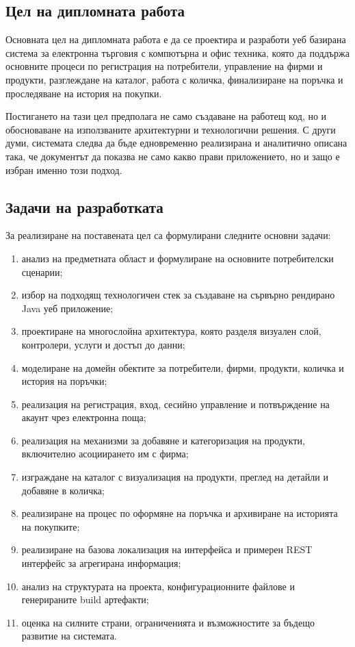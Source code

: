 \subsection{Цел на дипломната работа}

Основната цел на дипломната работа е да се проектира и разработи уеб базирана система за електронна търговия с компютърна и офис техника, която да поддържа основните процеси по регистрация на потребители, управление на фирми и продукти, разглеждане на каталог, работа с количка, финализиране на поръчка и проследяване на история на покупки.

Постигането на тази цел предполага не само създаване на работещ код, но и обосноваване на използваните архитектурни и технологични решения. С други думи, системата следва да бъде едновременно реализирана и аналитично описана така, че документът да показва не само какво прави приложението, но и защо е избран именно този подход.

\subsection{Задачи на разработката}

За реализиране на поставената цел са формулирани следните основни задачи:

\begin{enumerate}[leftmargin=*]
    \item анализ на предметната област и формулиране на основните потребителски сценарии;
    \item избор на подходящ технологичен стек за създаване на сървърно рендирано Java уеб приложение;
    \item проектиране на многослойна архитектура, която разделя визуален слой, контролери, услуги и достъп до данни;
    \item моделиране на домейн обектите за потребители, фирми, продукти, количка и история на поръчки;
    \item реализация на регистрация, вход, сесийно управление и потвърждение на акаунт чрез електронна поща;
    \item реализация на механизми за добавяне и категоризация на продукти, включително асоциирането им с фирма;
    \item изграждане на каталог с визуализация на продукти, преглед на детайли и добавяне в количка;
    \item реализиране на процес по оформяне на поръчка и архивиране на историята на покупките;
    \item реализиране на базова локализация на интерфейса и примерен REST интерфейс за агрегирана информация;
    \item анализ на структурата на проекта, конфигурационните файлове и генерираните build артефакти;
    \item оценка на силните страни, ограниченията и възможностите за бъдещо развитие на системата.
\end{enumerate}

